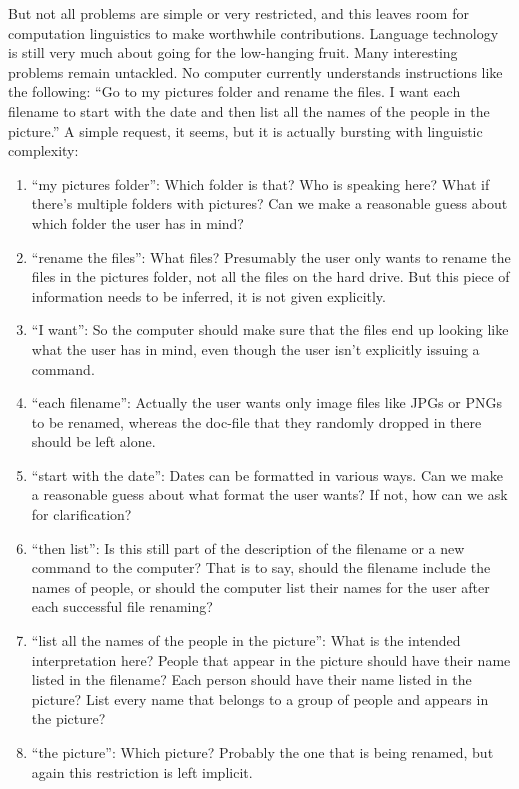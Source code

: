 But not all problems are simple or very restricted, and this leaves room for computation linguistics to make worthwhile contributions.
Language technology is still very much about going for the low-hanging fruit.
Many interesting problems remain untackled.
No computer currently understands instructions like the following: ``Go to my pictures folder and rename the files. I want each filename to start with the date and then list all the names of the people in the picture.''
A simple request, it seems, but it is actually bursting with linguistic complexity:
%
\begin{enumerate}
    \item ``my pictures folder'':
            Which folder is that?
            Who is speaking here?
            What if there's multiple folders with pictures?
            Can we make a reasonable guess about which folder the user has in mind?
    \item ``rename the files'':
            What files?
            Presumably the user only wants to rename the files in the pictures folder, not all the files on the hard drive.
            But this piece of information needs to be inferred, it is not given explicitly.
    \item ``I want'':
            So the computer should make sure that the files end up looking like what the user has in mind, even though the user isn't explicitly issuing a command.
    \item ``each filename'':
            Actually the user wants only image files like JPGs or PNGs to be renamed, whereas the doc-file that they randomly dropped in there should be left alone.
    \item ``start with the date'':
            Dates can be formatted in various ways.
            Can we make a reasonable guess about what format the user wants?
            If not, how can we ask for clarification?
    \item ``then list'':
            Is this still part of the description of the filename or a new command to the computer?
            That is to say, should the filename include the names of people, or should the computer list their names for the user after each successful file renaming?
    \item ``list all the names of the people in the picture'':
            What is the intended interpretation here?
            People that appear in the picture should have their name listed in the filename?
            Each person should have their name listed in the picture?
            List every name that belongs to a group of people and appears in the picture?
    \item ``the picture'':
            Which picture?
            Probably the one that is being renamed, but again this restriction is left implicit.
\end{enumerate}
